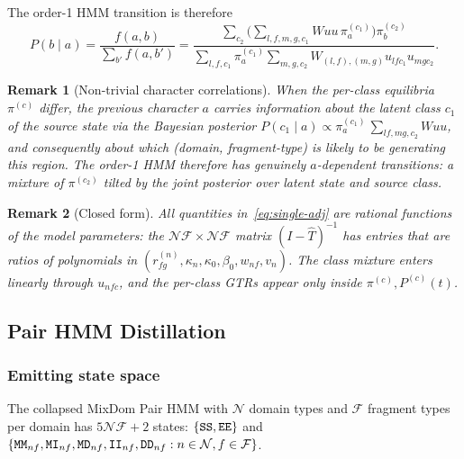 \documentclass{article}
\newtheorem{remark}{Remark}
\newcommand\ext{r}
\newcommand\main{0}
\newcommand\dom{n}
\newcommand\ndom{\mathcal{N}}
\newcommand\nfrag{\mathcal{F}}
\newcommand\domdist{v}
\newcommand\fragdist{w}
\newcommand\classdist{u}
\newcommand\anctok{a}
\newcommand\destok{b}
\newcommand\eqm{\pi}
\newcommand\evoltime{t}
\newcommand\sta{{\tt S}}
\newcommand\mat{{\tt M}}
\newcommand\ins{{\tt I}}
\newcommand\del{{\tt D}}
\newcommand\fin{{\tt E}}
\newcommand\effT{\hat{T}}
\newcommand\srcdom{l}
\newcommand\destdom{m}
\newcommand\frag{f}
\newcommand\srcfrag{f}
\newcommand\destfrag{g}
\newcommand\class{c}
\begin{document}
The order-1 HMM transition is therefore
\[
P(\destok \mid \anctok)
= \frac{f(\anctok, \destok)}{\sum_{\destok'} f(\anctok, \destok')}
= \frac{
    \sum_{\class_2}
    \big(\sum_{\srcdom,\srcfrag,\destdom,\destfrag,\class_1}
         W \classdist \classdist\, \eqm^{(\class_1)}_\anctok\big)
    \eqm^{(\class_2)}_\destok
  }{
    \sum_{\srcdom,\srcfrag,\class_1} \eqm^{(\class_1)}_\anctok
    \sum_{\destdom,\destfrag,\class_2}
      W_{(\srcdom,\srcfrag),(\destdom,\destfrag)}
      \classdist_{\srcdom\srcfrag\class_1}
      \classdist_{\destdom\destfrag\class_2}
  }.
\]

\begin{remark}[Non-trivial character correlations]
When the per-class equilibria $\eqm^{(\class)}$ differ, the previous
character $\anctok$ carries information about the latent class $\class_1$
of the source state via the Bayesian posterior
$P(\class_1 \mid \anctok) \propto \eqm^{(\class_1)}_\anctok\,
\sum_{\srcdom\srcfrag,\destdom\destfrag,\class_2}
W \classdist \classdist$,
and consequently about which (domain, fragment-type) is likely to be
generating this region. The order-1 HMM therefore has genuinely
$\anctok$-dependent transitions: a mixture of $\eqm^{(\class_2)}$ tilted
by the joint posterior over latent state and source class.
\end{remark}

\begin{remark}[Closed form]
All quantities in~\eqref{eq:single-adj} are rational functions of the
model parameters: the $\ndom\nfrag \times \ndom\nfrag$ matrix
$(I - \effT)^{-1}$ has entries that are ratios of polynomials in
$(\ext^{(\dom)}_{\srcfrag\destfrag}, \kappa_\dom, \kappa_\main, \beta_\main,
\fragdist_{\dom\frag}, \domdist_\dom)$. The class mixture enters
linearly through $\classdist_{\dom\frag\class}$, and the per-class GTRs
appear only inside $\eqm^{(\class)}, P^{(\class)}(\evoltime)$.
\end{remark}


\subsection{Pair HMM Distillation}

\subsubsection{Emitting state space}

The collapsed MixDom Pair HMM with $\ndom$ domain types and $\nfrag$
fragment types per domain has $5\ndom\nfrag + 2$ states:
$\{ \sta\sta, \fin\fin \}$ and
$\{ \mat\mat_{\dom\frag}, \mat\ins_{\dom\frag}, \mat\del_{\dom\frag},
\ins\ins_{\dom\frag}, \del\del_{\dom\frag}
: \dom \in \ndom, \frag \in \nfrag \}$.
\end{document}
